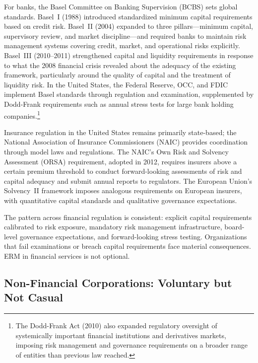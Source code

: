 \documentclass[11pt,openany]{book}
\begin{document}
For banks, the Basel Committee on Banking Supervision (BCBS) sets global standards. Basel~I (1988) introduced standardized minimum capital requirements based on credit risk. Basel~II (2004) expanded to three pillars---minimum capital, supervisory review, and market discipline---and required banks to maintain risk management systems covering credit, market, and operational risks explicitly. Basel~III (2010--2011) strengthened capital and liquidity requirements in response to what the 2008 financial crisis revealed about the adequacy of the existing framework, particularly around the quality of capital and the treatment of liquidity risk. In the United States, the Federal Reserve, OCC, and FDIC implement Basel standards through regulation and examination, supplemented by Dodd-Frank requirements such as annual stress tests for large bank holding companies.\footnote{The Dodd-Frank Act (2010) also expanded regulatory oversight of systemically important financial institutions and derivatives markets, imposing risk management and governance requirements on a broader range of entities than previous law reached.}

Insurance regulation in the United States remains primarily state-based; the National Association of Insurance Commissioners (NAIC) provides coordination through model laws and regulations. The NAIC's Own Risk and Solvency Assessment (ORSA) requirement, adopted in 2012, requires insurers above a certain premium threshold to conduct forward-looking assessments of risk and capital adequacy and submit annual reports to regulators. The European Union's Solvency~II framework imposes analogous requirements on European insurers, with quantitative capital standards and qualitative governance expectations.

The pattern across financial regulation is consistent: explicit capital requirements calibrated to risk exposure, mandatory risk management infrastructure, board-level governance expectations, and forward-looking stress testing. Organizations that fail examinations or breach capital requirements face material consequences. ERM in financial services is not optional.

\subsection{Non-Financial Corporations: Voluntary but Not Casual}
\label{subsec:non-financial}
\end{document}
